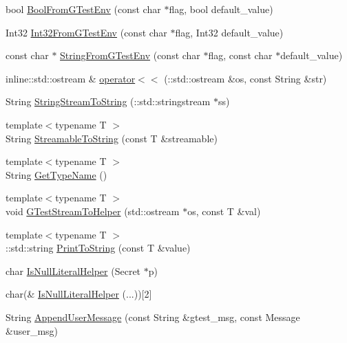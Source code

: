 \begin{DoxyCompactItemize}
bool \hyperlink{namespacetesting_1_1internal_af17bf74326e1076c47455ef2618c1a1a}{\-Bool\-From\-G\-Test\-Env} (const char $\ast$flag, bool default\-\_\-value)
\item 
\-Int32 \hyperlink{namespacetesting_1_1internal_a960e275ac93c373f223887e57ec54381}{\-Int32\-From\-G\-Test\-Env} (const char $\ast$flag, \-Int32 default\-\_\-value)
\item 
const char $\ast$ \hyperlink{namespacetesting_1_1internal_a0154be115eea16783f82d3642ff27940}{\-String\-From\-G\-Test\-Env} (const char $\ast$flag, const char $\ast$default\-\_\-value)
\item 
inline\-::std\-::ostream \& \hyperlink{namespacetesting_1_1internal_aef0e96aa2c28064d8dbc6d0465aeed40}{operator$<$$<$} (\-::std\-::ostream \&os, const \-String \&str)
\item 
\-String \hyperlink{namespacetesting_1_1internal_abf99dee8db2ca5a9bc512dd6cc34f048}{\-String\-Stream\-To\-String} (\-::std\-::stringstream $\ast$ss)
\item 
{\footnotesize template$<$typename T $>$ }\\\-String \hyperlink{namespacetesting_1_1internal_a66c1c8bcb19e8562b79bd8ef9bab2aa9}{\-Streamable\-To\-String} (const \-T \&streamable)
\item 
{\footnotesize template$<$typename T $>$ }\\\-String \hyperlink{namespacetesting_1_1internal_a8b5db836af4b8a8eaef9c27e7b7f0463}{\-Get\-Type\-Name} ()
\item 
{\footnotesize template$<$typename T $>$ }\\void \hyperlink{fused-src_2gtest_2gtest_8h_af0fbea15c77edca96f48afb7c0e1c2b7}{\-G\-Test\-Stream\-To\-Helper} (std\-::ostream $\ast$os, const \-T \&val)
\item 
{\footnotesize template$<$typename T $>$ }\\\-::std\-::string \hyperlink{namespacetesting_a44c473dd1caaed17b53a19dff4e4f7ef}{\-Print\-To\-String} (const \-T \&value)
\item 
char \hyperlink{namespacetesting_1_1internal_a22c4be07d56f4f76ad08b35bfd40a685}{\-Is\-Null\-Literal\-Helper} (\-Secret $\ast$p)
\item 
char(\& \hyperlink{namespacetesting_1_1internal_ab06a7bb0f775834a238d9ad7e8152813}{\-Is\-Null\-Literal\-Helper} (...))\mbox{[}2\mbox{]}
\item 
\-String \hyperlink{namespacetesting_1_1internal_a92cc3c0f16012ce7143a5c3256c00a29}{\-Append\-User\-Message} (const \-String \&gtest\-\_\-msg, const \-Message \&user\-\_\-msg)

\end{DoxyCompactItemize}
